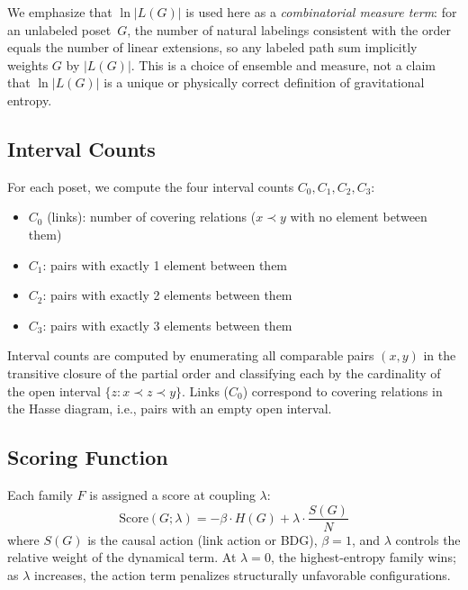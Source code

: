 \documentclass[12pt,a4paper]{article}
\begin{document}
We emphasize that $\ln|L(G)|$ is used here as a \emph{combinatorial measure term}: for an unlabeled poset~$G$, the number of natural labelings consistent with the order equals the number of linear extensions, so any labeled path sum implicitly weights $G$ by $|L(G)|$. This is a choice of ensemble and measure, not a claim that $\ln|L(G)|$ is a unique or physically correct definition of gravitational entropy.

\subsection{Interval Counts}
\label{sec:intervals}

For each poset, we compute the four interval counts $C_0, C_1, C_2, C_3$:
\begin{itemize}
  \item $C_0$ (links): number of covering relations ($x \prec y$ with no element between them)
  \item $C_1$: pairs with exactly 1 element between them
  \item $C_2$: pairs with exactly 2 elements between them
  \item $C_3$: pairs with exactly 3 elements between them
\end{itemize}

Interval counts are computed by enumerating all comparable pairs $(x, y)$ in the transitive closure
of the partial order and classifying each by the cardinality of the open interval
$\{z : x \prec z \prec y\}$.
Links ($C_0$) correspond to covering relations in the Hasse diagram, i.e., pairs with
an empty open interval.

\subsection{Scoring Function}
\label{sec:scoring}

Each family $F$ is assigned a score at coupling $\lambda$:
\begin{equation}
\mathrm{Score}(G;\lambda) = -\beta \cdot H(G) + \lambda \cdot \frac{S(G)}{N}
\label{eq:score}
\end{equation}
where $S(G)$ is the causal action (link action or BDG), $\beta = 1$, and $\lambda$ controls
the relative weight of the dynamical term. At $\lambda = 0$, the highest-entropy family
wins; as $\lambda$ increases, the action term penalizes structurally unfavorable configurations.


\end{document}
